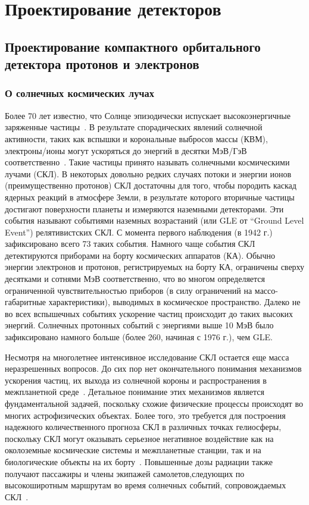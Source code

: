 \chapter{Проектирование детекторов}\label{ch:detectors}

\section{Проектирование компактного орбитального детектора протонов и электронов}\label{sec:detectors/satellite}

\subsection{О солнечных космических лучах}

Более 70 лет известно, что Солнце эпизодически испускает высокоэнергичные заряженные частицы~\cite{forbush1946three}. В результате спорадических явлений солнечной активности, таких как вспышки и корональные выбросов массы (КВМ), электроны/ионы могут ускоряться до энергий в десятки МэВ/ГэВ соответственно~\cite{miroshnichenko2015solar}. Такие частицы принято называть солнечными космическими лучами (СКЛ). В некоторых довольно редких случаях потоки и энергии ионов (преимущественно протонов) СКЛ достаточны для того, чтобы породить каскад ядерных реакций в атмосфере Земли, в результате которого вторичные частицы достигают поверхности планеты и измеряются наземными детекторами. Эти события называют событиями наземных возрастаний (или GLE от “Ground Level Event”) релятивистских СКЛ. С момента первого наблюдения (в 1942 г.) зафиксировано всего 73 таких события. Намного чаще события СКЛ детектируются приборами на борту космических аппаратов (КА). Обычно энергии электронов и протонов, регистрируемых на борту КА, ограничены сверху десятками и сотнями МэВ соответственно, что во многом определяется ограниченной чувствительностью приборов (в силу ограничений на массо-габаритные характеристики), выводимых в космическое пространство. Далеко не во всех вспышечных событиях ускорение частиц происходит до таких высоких энергий. Солнечных протонных событий с энергиями выше 10 МэВ было зафиксировано намного больше (более 260, начиная с 1976 г.), чем GLE.

Несмотря на многолетнее интенсивное исследование СКЛ остается еще масса неразрешенных вопросов. До сих пор нет окончательного понимания механизмов ускорения частиц, их выхода из солнечной короны и распространения в межпланетной среде~\cite{miroshnichenko2015solar, lin2011energy}. Детальное понимание этих механизмов является фундаментальной задачей, поскольку схожие физические процессы происходят во многих астрофизических объектах. Более того, это требуется для построения надежного количественного прогноза СКЛ в различных точках гелиосферы, поскольку СКЛ могут оказывать серьезное негативное воздействие как на околоземные космические системы и межпланетные станции, так и на биологические объекты на их борту~\cite{petrukovich2008, hoff2004interplanetary, iucci2005space, hu2009modeling, zeitlin2013measurements}. Повышенные дозы радиации также получают пассажиры и члены экипажей самолетов,следующих по высокоширотным маршрутам во время солнечных событий, сопровождаемых СКЛ~\cite{beck2005tepc}.

